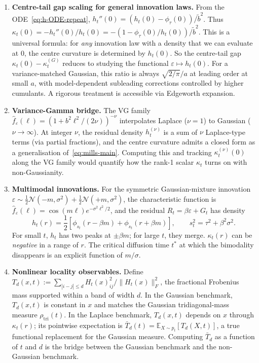 \documentclass[11pt,a4paper,openany]{book}
\theoremstyle{plainserif}
\theoremstyle{definition}
\theoremstyle{remarkstyle}
\newcommand{\E}{\mathbb{E}}
\newcommand{\Normal}{\mathcal{N}}
\newcommand{\btilde}{\tilde{b}}
\newcommand{\hatfn}[1]{\widehat{#1}}
\begin{document}
\begin{enumerate}[leftmargin=2em]
\item \textbf{Centre-tail gap scaling for general innovation laws.}
From the ODE~\eqref{eq:h-ODE-repeat}, $h_t''(0) = (h_t(0) - \phi_\tau(0))/\btilde^2$.
Thus $\kappa_t(0) = -h_t''(0)/h_t(0) = -(1 - \phi_\tau(0)/h_t(0))/\btilde^2$.
This is a universal formula: for \emph{any} innovation law with a density
that we can evaluate at $0$, the centre curvature is determined by
$h_t(0)$. So the centre-tail gap $\kappa_t(0) - \kappa_t^{(G)}$ reduces to
studying the functional $\varepsilon \mapsto h_t(0)$. For a variance-matched
Gaussian, this ratio is always $\sqrt{2/\pi}/a$ at leading order at small
$a$, with model-dependent subleading corrections controlled by higher
cumulants. A rigorous treatment is accessible via Edgeworth expansion.

\item \textbf{Variance-Gamma bridge.}
The VG family $\hatfn f_\varepsilon(\ell) = (1 + b^2\ell^2/(2\nu))^{-\nu}$
interpolates Laplace ($\nu=1$) to Gaussian ($\nu\to\infty$). At integer
$\nu$, the residual density $h_t^{(\nu)}$ is a sum of $\nu$ Laplace-type
terms (via partial fractions), and the centre curvature admits a closed
form as a generalisation of~\eqref{eq:mills-main}. Computing this and
tracking $\kappa_t^{(\nu)}(0)$ along the VG family would quantify how
the rank-1 scalar $\kappa_t$ turns on with non-Gaussianity.

\item \textbf{Multimodal innovations.}
For the symmetric Gaussian-mixture innovation
$\varepsilon \sim \tfrac12 \Normal(-m, \sigma^2) + \tfrac12 \Normal(+m, \sigma^2)$,
the characteristic function is
$\hatfn f_\varepsilon(\ell) = \cos(m\ell)e^{-\sigma^2\ell^2/2}$, and the
residual $R_t = \beta\varepsilon + G_t$ has density
\begin{equation}
h_t(r) = \frac{1}{2}[\phi_{s_t}(r - \beta m) + \phi_{s_t}(r + \beta m)],
\qquad s_t^2 = \tau^2 + \beta^2 \sigma^2.
\end{equation}
For small $t$, $h_t$ has two peaks at $\pm\beta m$; for large $t$, they
merge. $\kappa_t(r)$ can be \emph{negative} in a range of $r$. The
critical diffusion time $t^*$ at which the bimodality disappears is an
explicit function of $m/\sigma$.

\item \textbf{Nonlinear locality observables.}
Define
$T_d(x, t) := \sum_{|i-j|\leq d} H_t(x)_{ij}^2 / \|H_t(x)\|_F^2$,
the fractional Frobenius mass supported within a band of width $d$.
In the Gaussian benchmark, $T_d(x, t)$ is constant in $x$ and matches
the Gaussian tridiagonal-mass measure $\rho_{\mathrm{tri}}(t)$. In the
Laplace benchmark, $T_d(x,t)$ depends on $x$ through $\kappa_t(r)$; its
pointwise expectation is
$\bar T_d(t) = \E_{X\sim p_t}[T_d(X,t)]$, a true functional replacement
for the Gaussian measure. Computing $\bar T_d$ as a function of $t$ and
$d$ is the bridge between the Gaussian benchmark and the non-Gaussian
benchmark.


\end{enumerate}
\end{document}
